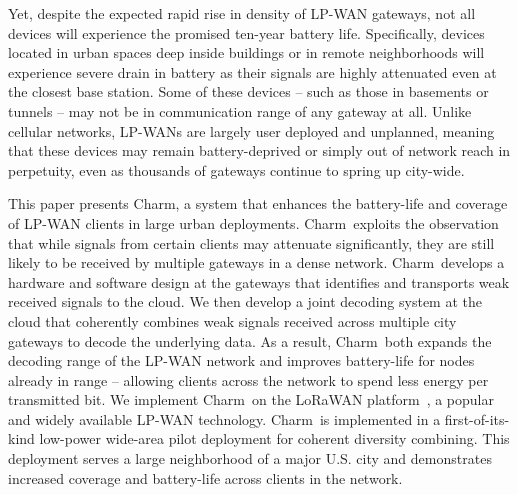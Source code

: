 
Yet, despite the expected rapid rise in density of LP-WAN gateways, not all devices will experience the promised ten-year battery life. Specifically, devices located in urban spaces deep inside buildings or in remote neighborhoods will experience severe drain in battery as their signals are highly attenuated even at the closest base station. Some of these devices -- such as those in basements or tunnels -- may not be in communication range of any gateway at all. Unlike cellular networks, LP-WANs are largely user deployed and unplanned, meaning that these devices may remain battery-deprived or simply out of network reach in perpetuity, even as thousands of gateways continue to spring up city-wide.  



This paper presents Charm, a system that enhances the battery-life and
coverage of LP-WAN clients in large urban deployments. Charm\ exploits the
observation that while signals from certain clients may attenuate significantly, they are still likely to be received by multiple gateways in a dense network. Charm\ develops a hardware and software design at the gateways that identifies and transports weak received signals to the cloud. We then develop a joint decoding system at the cloud that coherently
combines weak signals received across multiple city gateways to decode the underlying data. As a result, Charm\ both expands the decoding range of the LP-WAN network and improves battery-life for nodes already in range -- allowing clients across the network to spend less energy per transmitted bit. We implement Charm\ on the LoRaWAN platform~\cite{LoRaWanAlliance2015}, a popular and widely available LP-WAN technology. Charm\ is
implemented in a first-of-its-kind low-power wide-area pilot deployment for
coherent diversity combining. This deployment serves a large neighborhood of a major U.S. city and
demonstrates increased coverage and battery-life across clients in the network.



